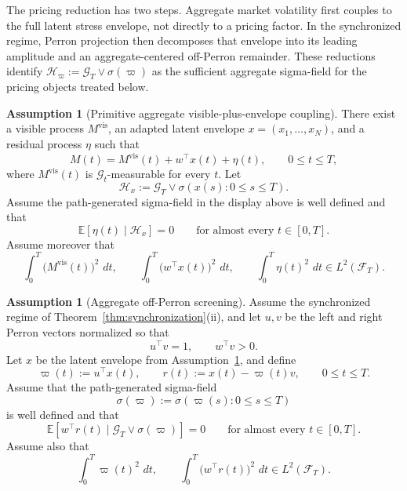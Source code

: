 \documentclass[11pt,a4paper]{amsart}
\theoremstyle{plain}
\theoremstyle{definition}
\newtheorem{assumption}[theorem]{Assumption}
\theoremstyle{remark}
\newcommand{\EE}{\mathbb{E}}
\newcommand{\dd}{\,d}
\newcommand{\cH}{\mathcal{H}}
\newcommand{\cF}{\mathcal{F}}
\newcommand{\cG}{\mathcal{G}}
\begin{document}
The pricing reduction has two steps.  Aggregate market volatility first couples to the full latent
stress envelope, not directly to a pricing factor.  In the synchronized regime, Perron projection
then decomposes that envelope into its leading amplitude and an aggregate-centered off-Perron
remainder.  These reductions identify \(\cH_\varpi:=\cG_T\vee \sigma(\varpi)\) as the sufficient
aggregate sigma-field for the pricing objects treated below.

\begin{assumption}[Primitive aggregate visible-plus-envelope coupling]\label{ass:aggregate-coupling}
There exist a visible process \(M^{\mathrm{vis}}\), an adapted latent envelope
\(x=(x_1,\dots,x_N)\), and a residual process \(\eta\) such that
\[
        M(t)=M^{\mathrm{vis}}(t)+w^\top x(t)+\eta(t),
        \qquad
        0\le t\le T,
\]
where \(M^{\mathrm{vis}}(t)\) is \(\cG_t\)-measurable for every \(t\).  Let
\[
        \cH_x:=\cG_T\vee \sigma(x(s):0\le s\le T).
\]
Assume the path-generated sigma-field in the display above is well defined and that
\[
        \EE[\eta(t)\mid \cH_x]=0
        \qquad
        \text{for almost every } t\in[0,T].
\]
Assume moreover that
\[
        \int_0^T \bigl(M^{\mathrm{vis}}(t)\bigr)^2\,\dd t,
        \qquad
        \int_0^T \bigl(w^\top x(t)\bigr)^2\,\dd t,
        \qquad
        \int_0^T \eta(t)^2\,\dd t
        \in L^2(\cF_T).
\]
\end{assumption}

\begin{assumption}[Aggregate off-Perron screening]\label{ass:aggregate-offperron}
Assume the synchronized regime of Theorem~\ref{thm:synchronization}(ii), and let \(u,v\) be the
left and right Perron vectors normalized so that
\[
        u^\top v=1,
        \qquad
        w^\top v>0.
\]
Let \(x\) be the latent envelope from Assumption~\ref{ass:aggregate-coupling}, and define
\[
        \varpi(t):=u^\top x(t),
        \qquad
        r(t):=x(t)-\varpi(t)v,
        \qquad
        0\le t\le T.
\]
Assume that the path-generated sigma-field
\[
        \sigma(\varpi):=\sigma(\varpi(s):0\le s\le T)
\]
is well defined and that
\[
        \EE[w^\top r(t)\mid \cG_T\vee \sigma(\varpi)]=0
        \qquad
        \text{for almost every } t\in[0,T].
\]
Assume also that
\[
        \int_0^T \varpi(t)^2\,\dd t,
        \qquad
        \int_0^T \bigl(w^\top r(t)\bigr)^2\,\dd t
        \in L^2(\cF_T).
\]
\end{assumption}
\end{document}
